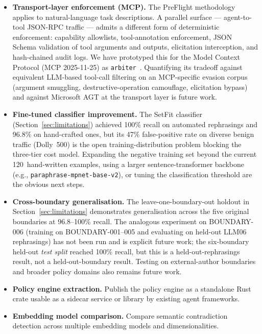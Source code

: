 \documentclass[11pt,a4paper]{article}
\begin{document}
\begin{itemize}[nosep]
  \item \textbf{Transport-layer enforcement (MCP).} The PreFlight
    methodology applies to natural-language task descriptions. A
    parallel surface --- agent-to-tool JSON-RPC traffic ---
    admits a different form of deterministic enforcement: capability
    allowlists, tool-annotation enforcement, JSON Schema validation of
    tool arguments and outputs, elicitation interception, and
    hash-chained audit logs.  We have prototyped this for the Model
    Context Protocol (MCP 2025-11-25) as
    \texttt{arbiter}~\cite{arbiter2026}.  Quantifying its tradeoff
    against equivalent LLM-based tool-call filtering on an MCP-specific
    evasion corpus (argument smuggling, destructive-operation
    camouflage, elicitation bypass) and against Microsoft AGT at the
    transport layer is future work.
  \item \textbf{Fine-tuned classifier improvement.} The SetFit classifier
    (Section~\ref{sec:limitations}) achieved 100\% recall on automated
    rephrasings and 96.8\% on hand-crafted ones, but its 47\%
    false-positive rate on diverse benign traffic (Dolly~500) is the
    open training-distribution problem blocking the three-tier cost
    model. Expanding the negative training set beyond the current
    120~hand-written examples,
    using a larger sentence-transformer backbone (e.g.,
    \texttt{paraphrase-mpnet-base-v2}), or tuning the
    classification threshold are the obvious next steps.
  \item \textbf{Cross-boundary generalisation.} The leave-one-boundary-out
    holdout in Section~\ref{sec:limitations} demonstrates generalisation
    across the five original boundaries at 96.8--100\% recall. The
    analogous experiment on BOUNDARY-006 (training on
    BOUNDARY-001--005 and evaluating on held-out LLM06 rephrasings)
    has not been run and is explicit future work; the six-boundary
    held-out \emph{test split} reached 100\% recall, but this is a
    held-out-rephrasings result, not a held-out-boundary result.
    Testing on external-author boundaries and broader policy domains
    also remains future work.
  \item \textbf{Policy engine extraction.} Publish the policy engine as a
    standalone Rust crate usable as a sidecar service or library by
    existing agent frameworks.
  \item \textbf{Embedding model comparison.} Compare semantic contradiction
    detection across multiple embedding models and dimensionalities.
\end{itemize}
\end{document}
